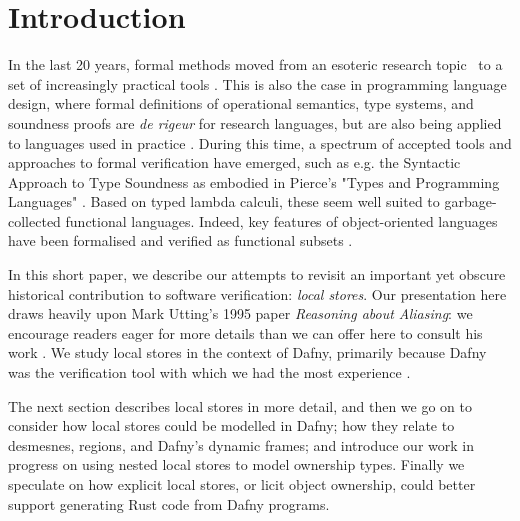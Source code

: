 \section{Introduction}

In the last 20 years, formal methods moved from an esoteric research
topic~\cite{CoqTute11} to a set of increasingly practical tools
\cite{alloybook,tlabook,spinbook,dafny2023}.  This is also the case in
programming language design, where formal definitions of operational
semantics, type systems, and soundness proofs are \textit{de rigeur}
for research languages, but are also being applied to languages used in
practice \cite{RustBelt18,djpRust}.  During this time, a spectrum of
accepted tools and approaches to formal verification have emerged,
such as e.g. the Syntactic Approach to Type Soundness
\cite{wright_syntactic_1994} as embodied in Pierce's "Types and
Programming Languages" \cite{pierce_types_2002}.  Based on typed
lambda calculi, these seem well suited to garbage-collected functional
languages. Indeed, key features of object-oriented languages have been
formalised and verified as functional subsets
\cite{IgaPieWadTOPLAS01}.





In this short paper, we describe our attempts to revisit an important
yet obscure historical contribution to software verification:
\textit{local stores}. Our presentation here draws heavily upon Mark
Utting's 1995 paper \textit{Reasoning about Aliasing}: we encourage
readers eager for more details than we can offer here to consult his
work \cite{utting1995,utting1998}.  We study local stores in the
context of Dafny, primarily because Dafny was the verification tool
with which we had the most experience
\cite{MPTP,learn2024,flags2024,dafnydala-ftfjp2024}.

The next section describes local stores in more detail, and then we go
on to consider how local stores could be modelled in Dafny; how they
relate to desmesnes, regions, and Dafny's dynamic frames; and
introduce our work in progress on using nested local stores to model
ownership types.  Finally we speculate on how explicit local stores,
or licit object ownership, could better support generating Rust code
from Dafny programs.

